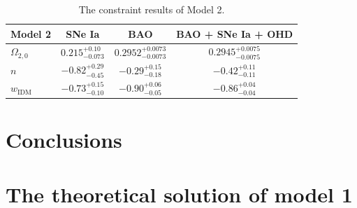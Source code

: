 \documentclass[twocolumn]{aastex631}
\begin{document}
   \begin{table}
      \centering
      \begin{tabular}{lccc}
         \hline\hline
         Model 2 & SNe Ia & BAO & BAO + SNe Ia + OHD \\
         \hline
         $\Omega_{2,0}$ & $0.215_{-0.073}^{+0.10}$
          & $0.2952_{-0.0073}^{+0.0073}$ & $0.2945_{-0.0075}^{+0.0075}$ \\
         $n$ & $-0.82_{-0.45}^{+0.29}$
          & $-0.29_{-0.18}^{+0.15}$ & $-0.42_{-0.11}^{+0.11}$ \\
         $w_{\text{IDM}}$ & $-0.73_{-0.10}^{+0.15}$
          & $-0.90_{-0.05}^{+0.06}$ & $-0.86_{-0.04}^{+0.04}$ \\
         \hline
      \end{tabular}
      \caption{The constraint results of Model 2.}
      \label{tab:5}
   \end{table}

\section{Conclusions}\label{sec:5}

\appendix

\section{The theoretical solution of model 1}
\end{document}
